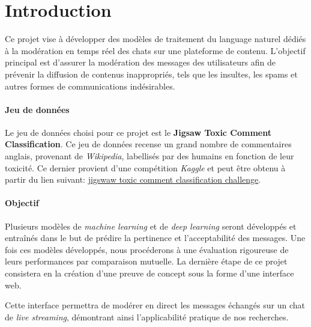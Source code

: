 
\chapter{Introduction}

Ce projet vise à développer des modèles de traitement du language naturel dédiés à la modération en temps réel des chats sur une plateforme de contenu. L'objectif principal est d'assurer la modération des messages des utilisateurs afin de prévenir la diffusion de contenus inappropriés, tels que les insultes, les spams et autres formes de communications indésirables.
\subsubsection*{Jeu de données} 
Le jeu de données choisi pour ce projet est le \textbf{Jigsaw Toxic Comment Classification}.
Ce jeu de données recense un grand nombre de commentaires anglais, provenant de \textit{Wikipedia}, labellisés par des humains en fonction de leur toxicité.
Ce dernier provient d'une compétition \textit{Kaggle} et peut être obtenu à partir du lien suivant: \href{https://www.kaggle.com/competitions/jigsaw-toxic-comment-classification-challenge/data}{jigswaw toxic comment classification challenge}.

\subsubsection*{Objectif}
Plusieurs modèles de \textit{machine learning} et de \textit{deep learning} seront développés et entraînés dans le but de prédire la pertinence et l'acceptabilité des messages.
Une fois ces modèles développés, nous procéderons à une évaluation rigoureuse de leurs performances par comparaison mutuelle. 
La dernière étape de ce projet consistera en la création d'une preuve de concept sous la forme d'une interface web. 

Cette interface permettra de modérer en direct les messages échangés sur un chat de \textit{live streaming}, démontrant ainsi l'applicabilité pratique de nos recherches.

